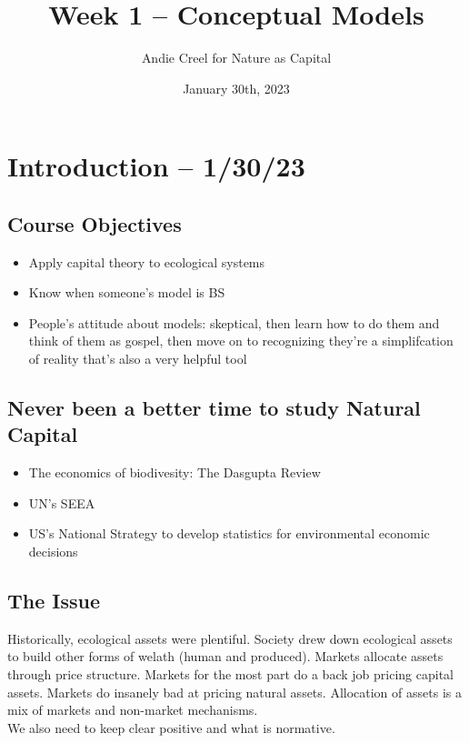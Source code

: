 \documentclass{article}
\title{Week 1 -- Conceptual Models}
\author{Andie Creel for Nature as Capital}
\date{January 30th, 2023}
\begin{document}
\maketitle

\section{Introduction -- 1/30/23}

\subsection{Course Objectives}

\begin{itemize}
    \item Apply capital theory to ecological systems
    \item Know when someone's model is BS
    \item People's attitude about models: skeptical, then learn how to do them and think of them as gospel, then move on to recognizing they're a simplifcation of reality that's also a very helpful tool 
\end{itemize}

\subsection{Never been a better time to study Natural Capital}

\begin{itemize}
    \item The economics of biodivesity: The Dasgupta Review
    \item UN's SEEA
    \item US's National Strategy to develop statistics for environmental economic decisions 
\end{itemize}

\subsection{The Issue}
Historically, ecological assets were plentiful. Society drew down ecological assets to build other forms of welath (human and produced). Markets allocate assets through price structure. Markets for the most part do a back job pricing capital assets. Markets do insanely bad at pricing natural assets. Allocation of assets is a mix of markets and non-market mechanisms. \\

We also need to keep clear positive and what is normative. \\
\end{document}
